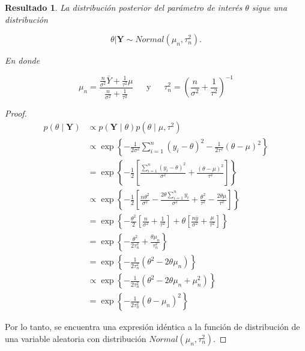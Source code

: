 \documentclass[
  10pt,
  spanish,
]{book}
\newtheorem{proposition}{Resultado}[chapter]
\theoremstyle{definition}
\theoremstyle{definition}
\theoremstyle{definition}
\theoremstyle{definition}
\theoremstyle{remark}
\begin{document}
\begin{proposition}
\protect\hypertarget{prp:unnamed-chunk-67}{}{\label{prp:unnamed-chunk-67} }La distribución posterior del parámetro de interés \(\theta\) sigue una distribución

\begin{equation*}
\theta|\mathbf{Y} \sim Normal(\mu_n,\tau^2_n).
\end{equation*}

En donde

\begin{equation}
\label{eq:TauSigman}
\mu_n=\frac{\frac{n}{\sigma^2}\bar{Y}+\frac{1}{\tau^2}\mu}{\frac{n}{\sigma^2}+\frac{1}{\tau^2}}
\ \ \ \ \ \ \ \text{y} \ \ \ \ \ \ \
\tau_n^2=\left(\frac{n}{\sigma^2}+\frac{1}{\tau^2}\right)^{-1}
\end{equation}
\end{proposition}

\begin{proof}
\iffalse{} {Prueba. } \fi{}\begin{align*}
p(\theta \mid \mathbf{Y})&\propto p(\mathbf{Y} \mid \theta)p(\theta \mid \mu,\tau^2)\\
&\propto \exp\left\{-\frac{1}{2\sigma^2}\sum_{i=1}^n(y_i-\theta)^2-\frac{1}{2\tau^2}(\theta-\mu)^2\right\}\\
&= \exp\left\{-\frac{1}{2}\left[\frac{\sum_{i=1}^n(y_i-\theta)^2}{\sigma^2}+\frac{(\theta-\mu)^2}{\tau^2}\right]\right\}\\
&\propto \exp\left\{-\frac{1}{2}\left[\frac{n\theta^2}{\sigma^2}-\frac{2\theta\sum_{i=1}^ny_i}{\sigma^2}+\frac{\theta^2}{\tau^2}-\frac{2\theta\mu}{\tau^2}\right]\right\}\\
&= \exp\left\{-\frac{\theta^2}{2}\left[\frac{n}{\sigma^2}+\frac{1}{\tau^2}\right]+
\theta\left[\frac{n\bar{y}}{\sigma^2}+\frac{\mu}{\tau^2}\right]\right\}\\
&= \exp\left\{-\frac{\theta^2}{2\tau^2_n}+\frac{\theta\mu_n}{\tau_n^2}\right\}\\
&= \exp\left\{-\frac{1}{2\tau^2_n}(\theta^2-2\theta\mu_n)\right\}\\
&\propto \exp\left\{-\frac{1}{2\tau^2_n}(\theta^2-2\theta\mu_n+\mu_n^2)\right\}\\
&= \exp\left\{-\frac{1}{2\tau^2_n}(\theta-\mu_n)^2\right\}
\end{align*}

Por lo tanto, se encuentra una expresión idéntica a la función de distribución de una variable aleatoria con distribución \(Normal(\mu_n,\tau_n^2)\).
\end{proof}
\end{document}
